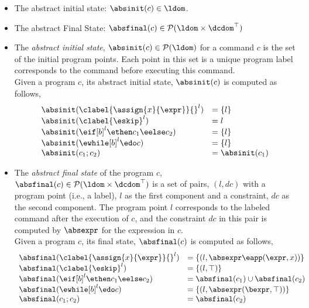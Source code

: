 %
\begin{itemize}
\item The abstract initial state: $\absinit(c) \in \ldom$.
%
\item The abstract Final State: $\absfinal(c) \in \mathcal{P}(\ldom \times \dcdom^{\top})$
\end{itemize}

\begin{itemize}
  \item The \emph{abstract initial state}, $\absinit(c) \in \mathcal{P}(\ldom)$
  for a command $c$ is the set of the initial program points.
Each point in this set is a unique program label corresponds to the command before executing this command. 
\\
Given a program $c$, its abstract initial state, $\absinit(c)$ is computed as follows,
%
\[
  \begin{array}{ll}
    \absinit(\clabel{\assign{x}{\expr}}{}^l)  & = \{l\}  \\
    \absinit(\clabel{\eskip}^{l})  & = l \\
    \absinit(\eif [b]^l \ethen c_1 \eelse c_2)  & = \{l\} \\
    \absinit(\ewhile [b]^l \edo c)  & = \{l\} \\
    \absinit(c_1 ; c_2)  & = \absinit(c_1) \\
 \end{array}
 \]
%
%
\item The \emph{abstract final state} of the program $c$, 
$\absfinal(c) \in \mathcal{P}(\ldom \times \dcdom^{\top})$
is a set of pairs, $(l, dc)$ with a
program point (i.e., a label), $l$ as the first component and a constraint, 
$dc$ as the second component.
The program point $l$ corresponds to the labeled command after the execution of $c$,
and the constraint $dc$ in this pair is computed by $\absexpr$ for the expression in $c$.
\\
Given a program $c$, its final state, $\absfinal(c)$ is computed as follows,
 \[
  \begin{array}{ll}
    \absfinal(\clabel{\assign{x}{\expr}}{}^l)  & = \{(l, \absexpr\eapp (\expr, x))\}  \\
     \absfinal(\clabel{\eskip}^{l})  
     & = \{(l, \top)\} \\
     \absfinal(\eif [b]^l \ethen c_1 \eelse c_2)  & = \absfinal(c_1) \cup \absfinal(c_2) \\
     \absfinal(\ewhile [b]^l \edo c)  & = \{(l, \absexpr(\bexpr, \top))\} \\
     \absfinal(c_1 ; c_2)  & =  \absfinal(c_2) \\
 \end{array}
 \]
\end{itemize}
